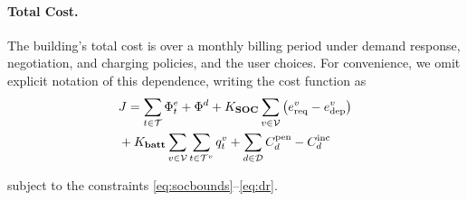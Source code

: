 \paragraph{Total Cost.}  
The building’s total cost is over a monthly billing period under demand response, negotiation, and charging policies, and the user choices. For convenience, we omit explicit notation of this dependence, writing the cost function as
\begin{equation}\label{eq:obj}
\begin{split}
& J = \sum_{t \in \mathcal{T}} \Phi^{e}_t + \Phi^d
+ K_{\mathbf{SOC}} \sum_{v \in \mathcal{V}} \left(e^v_{\mathrm{req}} - e^v_{\mathrm{dep}} \right)\\
& + K_{\mathbf{batt}} \sum_{v \in \mathcal{V}} \sum_{t \in \mathcal{T}^v} q_t^v + \sum_{d \in \mathcal D} C_{d}^{\mathrm{pen}} - C_{d}^{\mathrm{inc}} 
\end{split}
\end{equation}

subject to the constraints \eqref{eq:socbounds}--\eqref{eq:dr}.



